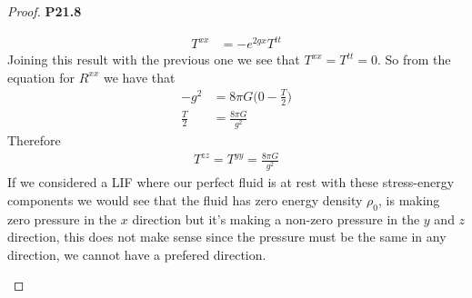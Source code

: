 \documentclass[11pt]{article}
\theoremstyle{definition}
\begin{document}
\begin{proof}{\textbf{P21.8}}
\begin{itemize}
\begin{align*}
    T^{xx} &= -e^{2gx}T^{tt}
\end{align*}
Joining this result with the previous one we see that $T^{xx} = T^{tt} = 0$.
So from the equation for $R^{xx}$ we have that
\begin{align*}
    -g^2 &= 8\pi G\bigg(0 - \frac{T}{2}\bigg) \\
    \frac{T}{2} &= \frac{8\pi G}{g^2}
\end{align*}
Therefore
\begin{align*}
    T^{zz} = T^{yy} = \frac{8\pi G}{g^2}
\end{align*}
If we considered a LIF where our perfect fluid is at rest with these
stress-energy components we would see that the fluid has 
zero energy density $\rho_0$, is making zero pressure in the $x$ direction but
it's making a non-zero pressure in the $y$ and $z$ direction, this does not
make sense since the pressure must be the same in any direction, we cannot
have a prefered direction.

\end{itemize}
\end{proof}
\end{document}
